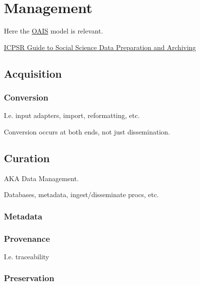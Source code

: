 \part{Management}

\begin{ednote}
  Here the
  \href{http://en.wikipedia.org/wiki/Open_Archival_Information_System}{OAIS}
  model is relevant.
\end{ednote}


\href{https://www.icpsr.umich.edu/icpsrweb/content/deposit/guide/}{ICPSR Guide to Social Science Data Preparation and Archiving}

\chapter{Acquisition}

\section{Conversion}
\label{sect:conversion}

I.e. input adapters, import, reformatting, etc.

Conversion occurs at both ends, not just dissemination.

\chapter{Curation}

AKA Data Management.

Databases, metadata, ingest/disseminate procs, etc.

\section{Metadata}
\label{sect:datameta}

\section{Provenance}
\label{sect:dataprovenance}

I.e. traceability

\section{Preservation}
\label{sect:datapreservation}

